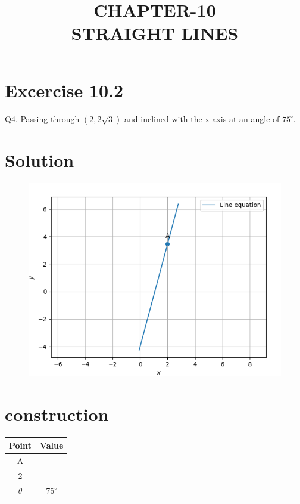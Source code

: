 \documentclass[journal,10pt,twocolumn]{article}
\title{\textbf{CHAPTER-10 \\ STRAIGHT LINES}}
\newcommand{\myvec}[1]{\ensuremath{\begin{pmatrix}#1\end{pmatrix}}}
\begin{document}
\maketitle
\section*{Excercise 10.2}

Q4. Passing through $(2,2\sqrt{3})$ and inclined with the x-axis at an angle of $75^\circ$.

\section*{\large Solution}

\begin{figure}[h!]
\centering
\includegraphics[width=\columnwidth]{./figs/line.png}	
\caption{}
\end{figure}


\section{construction}

\begin{tabular}{|c|c|}
	\hline
	\textbf{Point}&\textbf{Value}\\
	\hline
	A&\myvec{2\\2\sqrt{3}}\\
	\hline
	$\theta$&75$^\circ$\\
	\hline
	
	
\end{tabular}
\end{document}
